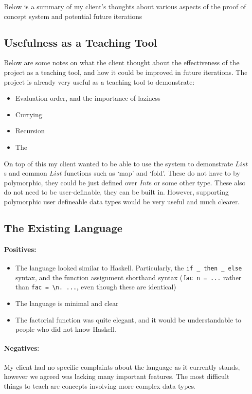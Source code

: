 \noindent Below is a summary of my client's thoughts about various aspects of the proof of concept system and potential future iterations

\subsection{Usefulness as a Teaching Tool}
Below are some notes on what the client thought about the effectiveness of the project as a teaching tool, and how it could be improved in future iterations.
The project is already very useful as a teaching tool to demonstrate:
\begin{itemize}
    \item Evaluation order, and the importance of laziness
    \item Currying
    \item Recursion
    \item The \lcalc
\end{itemize}

On top of this my client wanted to be able to use the system to demonstrate $List$s and common $List$ functions such as `map' and `fold'. These do not have to by polymorphic, they could be just defined over $Int$s or some other type. These also do not need to be user-definable, they can be built in. However, supporting polymorphic user defineable data types would be very useful and much clearer. 

\subsection{The Existing Language}
\paragraph{Positives:}
\begin{itemize}
    \item The language looked similar to Haskell. Particularly, the \verb|if _ then _ else| syntax, and the function assignment shorthand syntax (\verb|fac n = ...| rather than \verb|fac = \n. ...|, even though these are identical)
    \item The language is minimal and clear
    \item The factorial function was quite elegant, and it would be understandable to people who did not know Haskell.  
\end{itemize}

\paragraph{Negatives:}
My client had no specific complaints about the language as it currently stands, however we agreed was lacking many important features. The most difficult things to teach are concepts involving more complex data types. 

